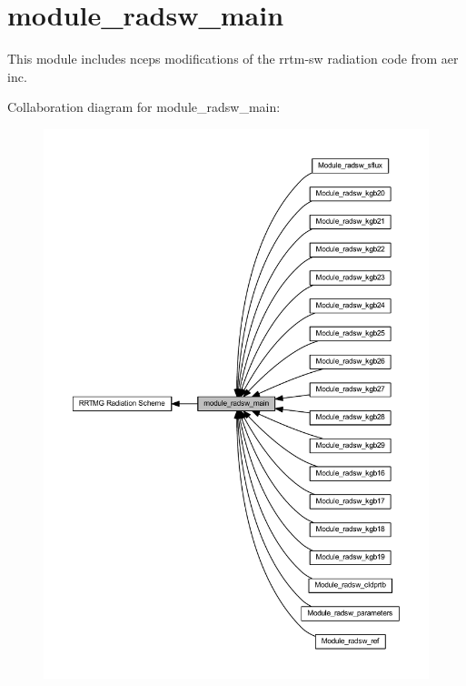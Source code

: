\hypertarget{group__module__radsw__main}{}\section{module\+\_\+radsw\+\_\+main}
\label{group__module__radsw__main}


This module includes ncep\textquotesingle{}s modifications of the rrtm-\/sw radiation code from aer inc.  


Collaboration diagram for module\+\_\+radsw\+\_\+main\+:\nopagebreak
\begin{figure}[H]
\begin{center}
\leavevmode
\includegraphics[width=350pt]{group__module__radsw__main}
\end{center}
\end{figure}
